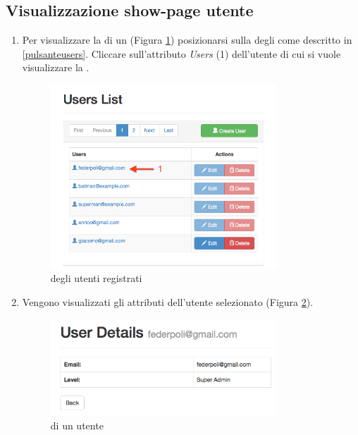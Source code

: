 	\subsection{Visualizzazione show-page utente} %
	\label{utenti-visualizzazione}
		\begin{enumerate}

			\item Per visualizzare la  di un  (Figura \ref{fig:usersEmailButton}) posizionarsi sulla  degli  come descritto in \ref{pulsanteusers}. Cliccare sull'attributo \emph{Users} (1) dell'utente di cui si vuole visualizzare la .

				\begin{figure}[H]
					\centering \includegraphics[width=0.8\textwidth]{img/usersEmailButton.png}
					\caption{ \label{fig:usersEmailButton}  degli utenti registrati}
				\end{figure}

			\item Vengono visualizzati gli attributi dell'utente selezionato (Figura \ref{fig:userShowPage}).

				\begin{figure}[H]
					\centering \includegraphics[width=0.8\textwidth]{img/userShowPage.png}
					\caption{ \label{fig:userShowPage}  di un utente}
				\end{figure}

		\end{enumerate}

